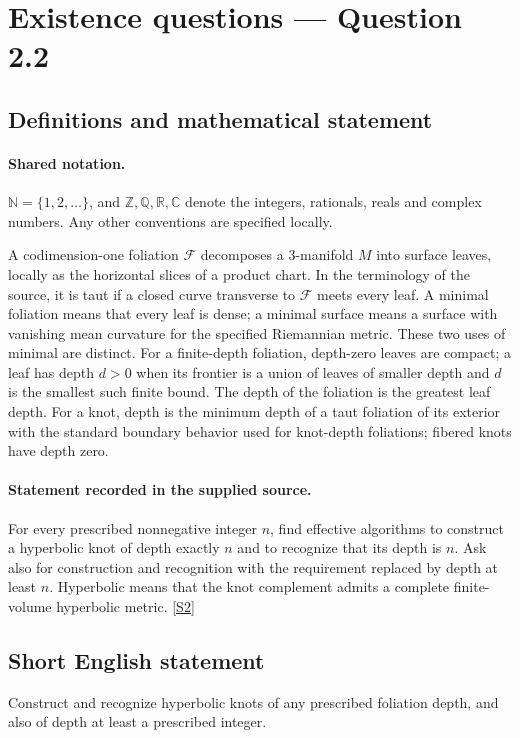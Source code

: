 \documentclass[11pt]{article}
\newcommand{\sref}[2]{\hyperlink{source:#1:#2}{[S#2]}}
\begin{document}
\section{Existence questions — Question 2.2}\label{statement}

\subsection{Definitions and mathematical statement}

\paragraph{Shared notation.}$\mathbb N=\{1,2,\ldots\}$, and $\mathbb Z,\mathbb Q,\mathbb R,\mathbb C$ denote the integers, rationals, reals and complex numbers. Any other conventions are specified locally.


A codimension-one foliation $\mathcal F$ decomposes a $3$-manifold $M$ into surface leaves, locally as the horizontal slices of a product chart. In the terminology of the source, it is taut if a closed curve transverse to $\mathcal F$ meets every leaf. A minimal foliation means that every leaf is dense; a minimal surface means a surface with vanishing mean curvature for the specified Riemannian metric. These two uses of minimal are distinct. For a finite-depth foliation, depth-zero leaves are compact; a leaf has depth $d>0$ when its frontier is a union of leaves of smaller depth and $d$ is the smallest such finite bound. The depth of the foliation is the greatest leaf depth. For a knot, depth is the minimum depth of a taut foliation of its exterior with the standard boundary behavior used for knot-depth foliations; fibered knots have depth zero.
\paragraph{Statement recorded in the supplied source.}
For every prescribed nonnegative integer $n$, find effective algorithms to construct a hyperbolic knot of depth exactly $n$ and to recognize that its depth is $n$. Ask also for construction and recognition with the requirement replaced by depth at least $n$. Hyperbolic means that the knot complement admits a complete finite-volume hyperbolic metric. \sref{statement}{2}
\subsection{Short English statement}
Construct and recognize hyperbolic knots of any prescribed foliation depth, and also of depth at least a prescribed integer.
\end{document}
